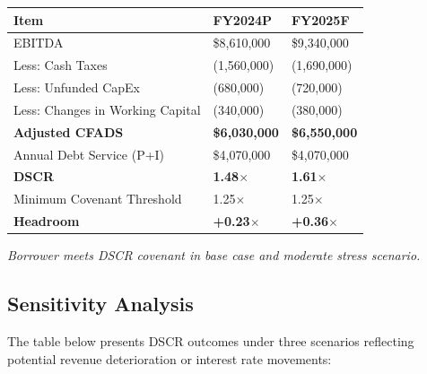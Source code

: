 \documentclass[11pt,a4paper]{article}
\begin{document}
\begin{tcolorbox}[creditbox, title={\faChartBar\enspace DSCR Calculation — Post-Closing Pro Forma}]
  \small
  \renewcommand{\arraystretch}{1.30}
  \begin{tabularx}{\linewidth}{@{} L{6.5cm} R{3.0cm} R{3.0cm} @{}}
    \toprule
    \textbf{Item} & \textbf{FY2024P} & \textbf{FY2025F} \\
    \midrule
    EBITDA                          & \$8,610,000   & \$9,340,000   \\
    Less: Cash Taxes                & (1,560,000)   & (1,690,000)   \\
    Less: Unfunded CapEx            & (680,000)     & (720,000)     \\
    Less: Changes in Working Capital& (340,000)     & (380,000)     \\
    \textbf{Adjusted CFADS}         & \textbf{\$6,030,000} & \textbf{\$6,550,000} \\
    \midrule
    Annual Debt Service (P+I)       & \$4,070,000   & \$4,070,000   \\
    \textbf{DSCR}                   & \textbf{1.48$\times$} & \textbf{1.61$\times$} \\
    Minimum Covenant Threshold      & 1.25$\times$  & 1.25$\times$  \\
    \textbf{Headroom}               & \textbf{+0.23$\times$} & \textbf{+0.36$\times$} \\
    \bottomrule
  \end{tabularx}
  \vspace{4pt}
  {\color{GreenOK}\faCheckCircle}\enspace\textit{\color{GreenOK}\small Borrower meets DSCR covenant in base case and moderate stress scenario.}
\end{tcolorbox}

\vspace{4pt}

\subsection{Sensitivity Analysis}

The table below presents DSCR outcomes under three scenarios reflecting potential revenue
deterioration or interest rate movements:
\end{document}
